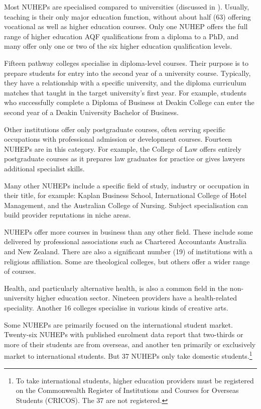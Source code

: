 \documentclass{grattan}
\begin{document}
Most NUHEPs are specialised compared to universities (discussed in ). Usually, teaching is their only major education function, without about half (63) offering vocational as well as higher education courses. Only one NUHEP offers the full range of higher education AQF qualifications from a diploma to a PhD, and many offer only one or two of the six higher education qualification levels.

Fifteen pathway colleges specialise in diploma-level courses. Their purpose is to prepare students for entry into the second year of a university course. Typically, they have a relationship with a specific university, and the diploma curriculum matches that taught in the target university's first year. For example, students who successfully complete a Diploma of Business at Deakin College can enter the second year of a Deakin University Bachelor of Business.

Other institutions offer only postgraduate courses, often serving specific occupations with professional admission or development courses. Fourteen NUHEPs are in this category. For example, the College of Law offers entirely postgraduate courses as it prepares law graduates for practice or gives lawyers additional specialist skills.

Many other NUHEPs include a specific field of study, industry or occupation in their title, for example: Kaplan Business School, International College of Hotel Management, and the Australian College of Nursing. Subject specialisation can build provider reputations in niche areas.

NUHEPs offer more courses in business than any other field. These include some delivered by professional associations such as Chartered Accountants Australia and New Zealand. There are also a significant number (19) of institutions with a religious affiliation. Some are theological colleges, but others offer a wider range of courses.

Health, and particularly alternative health, is also a common field in the non-university higher education sector. Nineteen providers have a health-related speciality. Another 16 colleges specialise in various kinds of creative arts.

Some NUHEPs are primarily focused on the international student market. Twenty-six NUHEPs with published enrolment data report that two-thirds or more of their students are from overseas, and another ten primarily or exclusively market to international students. But 37 NUHEPs only take domestic students.\footnote{To take international students, higher education providers must be registered on the Commonwealth Register of Institutions and Courses for Overseas Students (CRICOS). The 37 are not registered.}
\end{document}

